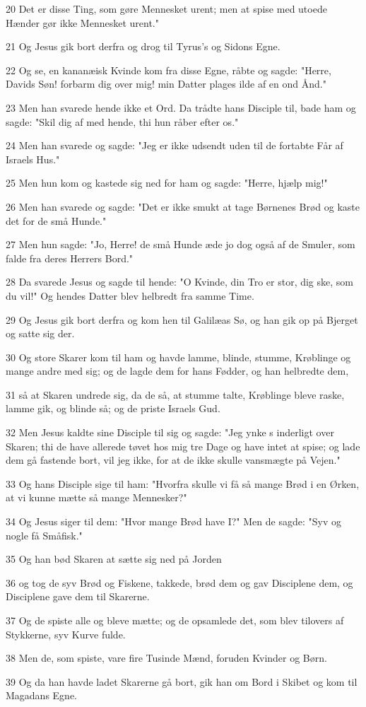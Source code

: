 \par 20 Det er disse Ting, som gøre Mennesket urent; men at spise med utoede Hænder gør ikke Mennesket urent."
\par 21 Og Jesus gik bort derfra og drog til Tyrus's og Sidons Egne.
\par 22 Og se, en kananæisk Kvinde kom fra disse Egne, råbte og sagde: "Herre, Davids Søn! forbarm dig over mig! min Datter plages ilde af en ond Ånd."
\par 23 Men han svarede hende ikke et Ord. Da trådte hans Disciple til, bade ham og sagde: "Skil dig af med hende, thi hun råber efter os."
\par 24 Men han svarede og sagde: "Jeg er ikke udsendt uden til de fortabte Får af Israels Hus."
\par 25 Men hun kom og kastede sig ned for ham og sagde: "Herre, hjælp mig!"
\par 26 Men han svarede og sagde: "Det er ikke smukt at tage Børnenes Brød og kaste det for de små Hunde."
\par 27 Men hun sagde: "Jo, Herre! de små Hunde æde jo dog også af de Smuler, som falde fra deres Herrers Bord."
\par 28 Da svarede Jesus og sagde til hende: "O Kvinde, din Tro er stor, dig ske, som du vil!" Og hendes Datter blev helbredt fra samme Time.
\par 29 Og Jesus gik bort derfra og kom hen til Galilæas Sø, og han gik op på Bjerget og satte sig der.
\par 30 Og store Skarer kom til ham og havde lamme, blinde, stumme, Krøblinge og mange andre med sig; og de lagde dem for hans Fødder, og han helbredte dem,
\par 31 så at Skaren undrede sig, da de så, at stumme talte, Krøblinge bleve raske, lamme gik, og blinde så; og de priste Israels Gud.
\par 32 Men Jesus kaldte sine Disciple til sig og sagde: "Jeg ynke s inderligt over Skaren; thi de have allerede tøvet hos mig tre Dage og have intet at spise; og lade dem gå fastende bort, vil jeg ikke, for at de ikke skulle vansmægte på Vejen."
\par 33 Og hans Disciple sige til ham: "Hvorfra skulle vi få så mange Brød i en Ørken, at vi kunne mætte så mange Mennesker?"
\par 34 Og Jesus siger til dem: "Hvor mange Brød have I?" Men de sagde: "Syv og nogle få Småfisk."
\par 35 Og han bød Skaren at sætte sig ned på Jorden
\par 36 og tog de syv Brød og Fiskene, takkede, brød dem og gav Disciplene dem, og Disciplene gave dem til Skarerne.
\par 37 Og de spiste alle og bleve mætte; og de opsamlede det, som blev tilovers af Stykkerne, syv Kurve fulde.
\par 38 Men de, som spiste, vare fire Tusinde Mænd, foruden Kvinder og Børn.
\par 39 Og da han havde ladet Skarerne gå bort, gik han om Bord i Skibet og kom til Magadans Egne.

